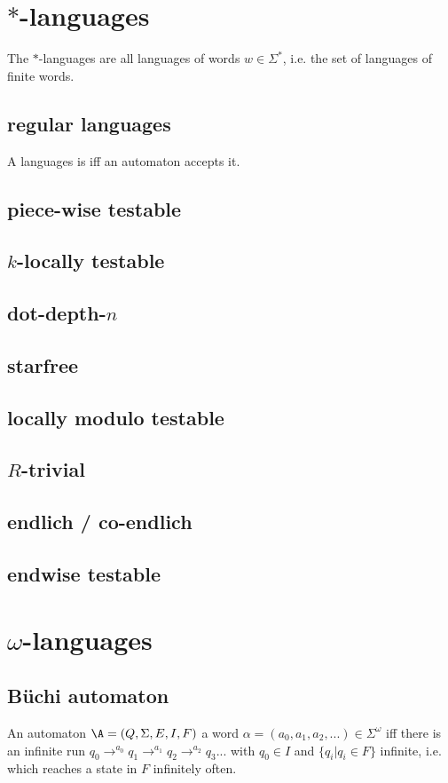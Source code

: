 

\section{$*$-languages}
The $*$-languages are all languages of words $w \in \Sigma^*$, i.e. the set of languages of finite words.

\subsection{regular languages}
A languages is  iff an automaton accepts it.

\subsection{piece-wise testable}
\subsection{$k$-locally testable}
\subsection{dot-depth-$n$}
\subsection{starfree}
\subsection{locally modulo testable}
\subsection{$R$-trivial}
\subsection{endlich / co-endlich}
\subsection{endwise testable}

\section{$\omega$-languages}
\subsection{Büchi automaton}
An automaton $\A = (Q, \Sigma, E, I, F)$  a word $\alpha = (a_0,a_1,a_2,...) \in \Sigma^\omega$ iff there is an infinite run $q_0 \rightarrow^{a_0} q_1 \rightarrow^{a_1} q_2 \rightarrow^{a_2} q_3 ...$ with $q_0 \in I$ and $\{ q_i | q_i \in F \}$ infinite, i.e. which reaches a state in $F$ infinitely often.

